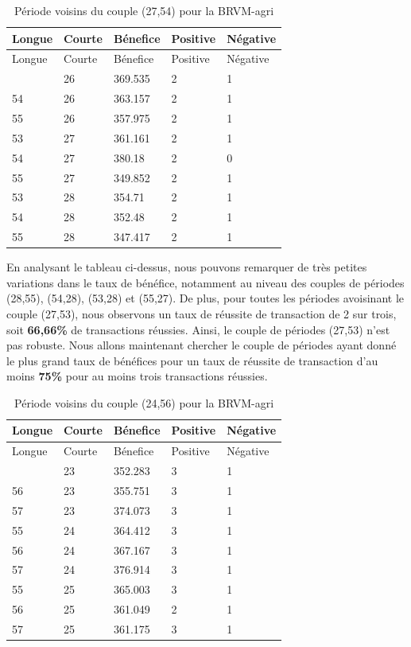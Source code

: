 \begin{itemize}
\begin{itemize}
    \begin{longtable}[]{@{}lllll@{}}
    \caption{Période voisins du couple (27,54) pour la
    BRVM-agri}\tabularnewline
    \toprule\noalign{}
    Longue & Courte & Bénefice & Positive & Négative \\
    \midrule\noalign{}
    \endfirsthead
    \toprule\noalign{}
    Longue & Courte & Bénefice & Positive & Négative \\
    \midrule\noalign{}
    \endhead
    \bottomrule\noalign{}
    \endlastfoot
    53 & 26 & 369.535 & 2 & 1 \\
    54 & 26 & 363.157 & 2 & 1 \\
    55 & 26 & 357.975 & 2 & 1 \\
    53 & 27 & 361.161 & 2 & 1 \\
    54 & 27 & 380.18 & 2 & 0 \\
    55 & 27 & 349.852 & 2 & 1 \\
    53 & 28 & 354.71 & 2 & 1 \\
    54 & 28 & 352.48 & 2 & 1 \\
    55 & 28 & 347.417 & 2 & 1 \\
    \end{longtable}

    {En analysant le tableau ci-dessus, nous pouvons remarquer de très
    petites variations dans le taux de bénéfice, notamment au niveau des
    couples de périodes (28,55), (54,28), (53,28) et (55,27). De plus,
    pour toutes les périodes avoisinant le couple (27,53), nous
    observons un taux de réussite de transaction de 2 sur trois, soit
    \textbf{66,66\%} de transactions réussies. Ainsi, le couple de
    périodes (27,53) n'est pas robuste. Nous allons maintenant chercher
    le couple de périodes ayant donné le plus grand taux de bénéfices
    pour un taux de réussite de transaction d'au moins \textbf{75\%}
    pour au moins trois transactions réussies.}

    \begin{longtable}[]{@{}lllll@{}}
    \caption{Période voisins du couple (24,56) pour la
    BRVM-agri}\tabularnewline
    \toprule\noalign{}
    Longue & Courte & Bénefice & Positive & Négative \\
    \midrule\noalign{}
    \endfirsthead
    \toprule\noalign{}
    Longue & Courte & Bénefice & Positive & Négative \\
    \midrule\noalign{}
    \endhead
    \bottomrule\noalign{}
    \endlastfoot
    55 & 23 & 352.283 & 3 & 1 \\
    56 & 23 & 355.751 & 3 & 1 \\
    57 & 23 & 374.073 & 3 & 1 \\
    55 & 24 & 364.412 & 3 & 1 \\
    56 & 24 & 367.167 & 3 & 1 \\
    57 & 24 & 376.914 & 3 & 1 \\
    55 & 25 & 365.003 & 3 & 1 \\
    56 & 25 & 361.049 & 2 & 1 \\
    57 & 25 & 361.175 & 3 & 1 \\
    \end{longtable}


\end{itemize}
\end{itemize}
